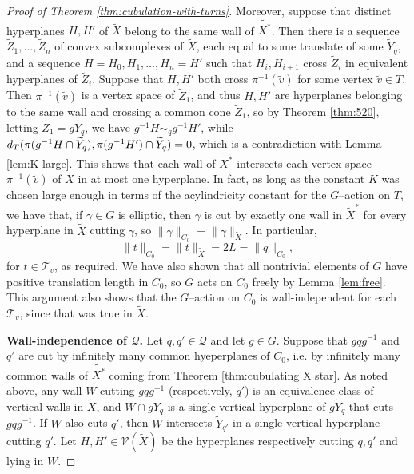 \documentclass[11pt,oneside]{amsart}
\theoremstyle{definition}
\newcommand{\dist}{\textup{\textsf{d}}}
\begin{document}
\begin{proof}[Proof of Theorem \ref{thm:cubulation-with-turns}]
Moreover, suppose that distinct hyperplanes $H,H'$ of $\widetilde X$ belong to the same wall of $\widetilde{X^*}$.  Then there is a sequence $\widetilde Z_1,\ldots,\widetilde Z_n$ of convex subcomplexes of $\widetilde X$, each equal to some translate of some $\widetilde Y_q$, and a sequence $H=H_0,H_1,\ldots,H_n=H'$ such that $H_i,H_{i+1}$ cross $\widetilde Z_i$ in equivalent hyperplanes of $\widetilde Z_i$.  Suppose that $H,H'$ both cross $\pi^{-1}(\tilde v)$ for some vertex $\tilde v\in T$.  Then $\pi^{-1}(\tilde v)$ is a vertex space of $\widetilde Z_1$, and thus $H,H'$ are hyperplanes belonging to the same wall and crossing a common cone $\widetilde Z_1$, so by Theorem \ref{thm:520}, letting $\widetilde Z_1=g\widetilde Y_q$, we have $g^{-1}H\sim_q g^{-1}H'$, while $\dist_T(\pi(g^{-1}H\cap \widetilde Y_q),\pi(g^{-1}H')\cap\widetilde Y_q)=0$, which is a contradiction with Lemma \ref{lem:K-large}.  This shows that each wall of $\widetilde{X^*}$ intersects each vertex space $\pi^{-1}(\tilde v)$ of $\widetilde X$ in at most one hyperplane.  In fact, as long as the constant $K$ was chosen large enough in terms of the acylindricity constant for the $G$--action on $T$, we have that, if $\gamma\in G$ is elliptic, then $\gamma$ is cut by exactly one wall in $\widetilde X^*$ for every hyperplane in $\widetilde X$ cutting $\gamma$, so $\|\gamma\|_{C_0}=\|\gamma\|_{\widetilde X}$.  In particular, 
$$\|t\|_{C_0}=\|t\|_{\widetilde X}=2L=\|q\|_{C_0},$$
for $t\in\mathcal T_v$, as required.  We have also shown that all nontrivial elements of $G$ have positive translation length in $C_0$, so $G$ acts on $C_0$ freely by Lemma \ref{lem:free}. This argument also shows that the $G$--action on $C_0$ is wall-independent for each $\mathcal T_v$, since that was true in $\widetilde X$.

\textbf{Wall-independence of $\mathcal Q$.} Let $q,q'\in\mathcal Q$ and let $g\in G$.  Suppose that $gqg^{-1}$ and $q'$ are cut by infinitely many common hyeperplanes of $C_0$, i.e. by infinitely many common walls of $\widetilde{X^*}$ coming from Theorem \ref{thm:cubulating X star}.  As noted above, any wall $W$ cutting $gqg^{-1}$ (respectively, $q'$) is an equivalence class of vertical walls in $\widetilde X$, and $W\cap g\widetilde Y_q$ is a single vertical hyperplane of $g\widetilde Y_q$ that cuts $gqg^{-1}$.  If $W$ also cuts $q'$, then $W$ intersects $\widetilde Y_{q'}$ in a single vertical hyperplane cutting $q'$.  Let $H,H'\in\mathcal V(\widetilde X)$ be the hyperplanes respectively cutting $q,q'$ and lying in $W$.  


\end{proof}
\end{document}
